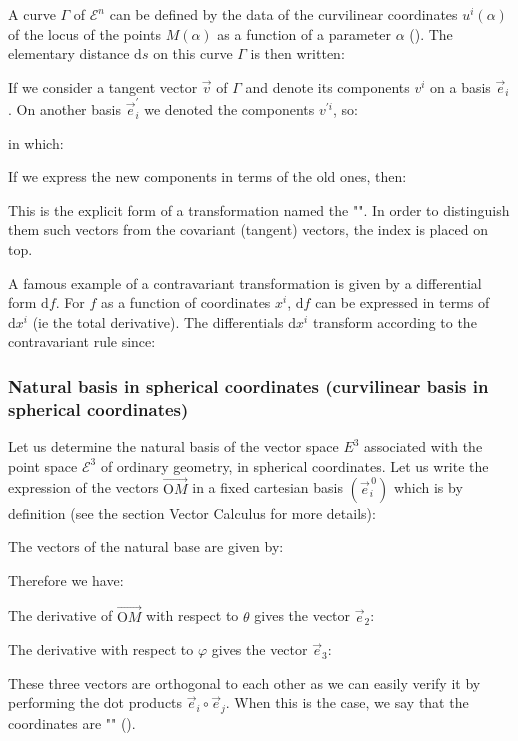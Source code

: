 	A curve $\Gamma$ of $\mathcal{E}^n$ can be defined by the data of the curvilinear coordinates $u^i(\alpha)$ of the locus of the points $M(\alpha)$ as a function of a parameter $\alpha$ (). The elementary distance $\mathrm{d}s$ on this curve $\Gamma$ is then written:
	
	If we consider a tangent vector $\vec{v}$ of $\Gamma$ and denote its components $v^{i}$ on a basis $\vec{e}_{i}$. On another basis $\vec{e}_{i}^{\prime}$ we denoted the components $v^{\prime i}$, so:
	
	in which:
	
	If we express the new components in terms of the old ones, then:
	
	This is the explicit form of a transformation named the "\label{contravariant transformation}". In order to distinguish them such vectors from the covariant (tangent) vectors, the index is placed on top.
	
	A famous example of a contravariant transformation is given by a differential form $\mathrm{d}f$. For $f$ as a function of coordinates $x^{i}$, $\mathrm{d}f$ can be expressed in terms of $\mathrm{d}x^{i}$ (ie the total derivative). The differentials $\mathrm{d}x^{i}$ transform according to the contravariant rule since:
	
	
	\subsubsection{Natural basis in spherical coordinates (curvilinear basis in spherical coordinates)}
	Let us determine the natural basis of the vector space $E^3$ associated with the point space $\mathcal{E}^3$ of ordinary geometry, in spherical coordinates. Let us write the expression of the vectors $\overrightarrow{\text{O}M}$ in a fixed cartesian basis $(\vec{e}_i^{\,0})$ which is by definition (see the section Vector Calculus for more details):
	
	The vectors of the natural base are given by:
	
	Therefore we have:
	
	The derivative of $\overrightarrow{\text{O}M}$ with respect to $\theta$ gives the vector $\vec{e}_2$:
	
	The derivative with respect to $\varphi$ gives the vector $\vec{e}_3$:
	
	These three vectors are orthogonal to each other as we can easily verify it by performing the dot products $\vec{e}_i\circ\vec{e}_j$. When this is the case, we say that the coordinates are "" ().

